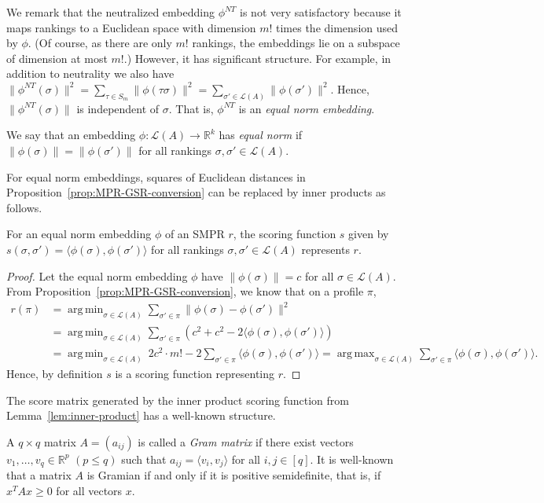 \documentclass[prodmode]{acmsmall-ec14}
\newcommand{\calL}{{\mathcal{L}}}
\newcommand{\rank}{{\calL(A)}}
\DeclareMathOperator*{\argmax}{arg\,max}
\DeclareMathOperator*{\argmin}{arg\,min}
\newcommand{\nt}{NT}
\begin{document}
%
We remark that the neutralized embedding $\phi^{\nt}$ is not very satisfactory because it maps rankings to a Euclidean space with dimension $m!$ times the dimension used by $\phi$. (Of course, as there are only $m!$ rankings, the embeddings lie on a subspace of dimension at most $m!$.) However, it has significant structure. For example, in addition to neutrality we also have $\|\phi^{\nt}(\sigma)\|^2 = \sum_{\tau \in S_m} \|\phi(\tau \sigma)\|^2 = \sum_{\sigma' \in \rank} \|\phi(\sigma')\|^2$. 
Hence, $\|\phi^{\nt}(\sigma)\|$ is independent of $\sigma$. That is, $\phi^{\nt}$ is an \emph{equal norm embedding}.
%
\begin{definition}
We say that an embedding $\phi : \rank \rightarrow \mathbb{R}^k$ has \emph{equal norm} if $\|\phi(\sigma)\| = \|\phi(\sigma')\|$ for all rankings $\sigma,\sigma' \in \rank$.
\end{definition}
%
For equal norm embeddings, squares of Euclidean distances in Proposition~\ref{prop:MPR-GSR-conversion} can be replaced by inner products as follows.
\begin{lemma}
For an equal norm embedding $\phi$ of an SMPR $r$, the scoring function $s$ given by $s(\sigma,\sigma') = \langle \phi(\sigma),\phi(\sigma') \rangle$ for all rankings $\sigma,\sigma' \in \rank$ represents $r$. 
\label{lem:inner-product}
\end{lemma}
\begin{proof}
Let the equal norm embedding $\phi$ have $\|\phi(\sigma)\| = c$ for all $\sigma \in \rank$. From Proposition~\ref{prop:MPR-GSR-conversion}, we know that on a profile $\pi$, 
\begin{align*}
r(\pi) &= \argmin_{\sigma \in \rank} \sum_{\sigma' \in \pi} \|\phi(\sigma)-\phi(\sigma')\|^2 \\
&= \argmin_{\sigma \in \rank} \sum_{\sigma' \in \pi} \left( c^2 + c^2 - 2 \langle \phi(\sigma), \phi(\sigma')\rangle\right) \\
&= \argmin_{\sigma \in \rank}\: 2 c^2\cdot m! - 2 \sum_{\sigma' \in \pi} \langle \phi(\sigma), \phi(\sigma')\rangle = \argmax_{\sigma \in \rank} \sum_{\sigma' \in \pi} \langle \phi(\sigma), \phi(\sigma')\rangle.
\end{align*}
Hence, by definition $s$ is a scoring function representing $r$. 
\end{proof}
%
The score matrix generated by the inner product scoring function from Lemma~\ref{lem:inner-product} has a well-known structure. 
\begin{definition}
A $q \times q$ matrix $A = (a_{ij})$ is called a \emph{Gram matrix} if there exist vectors $v_1,\ldots,v_q \in \mathbb{R}^p$ $(p \leq q)$ such that $a_{ij} = \langle v_i,v_j \rangle$ for all $i,j \in [q]$. It is well-known that a matrix $A$ is Gramian if and only if it is positive semidefinite, that is, if $x^T A x \geq 0$ for all vectors $x$. 
\end{definition}
\end{document}
